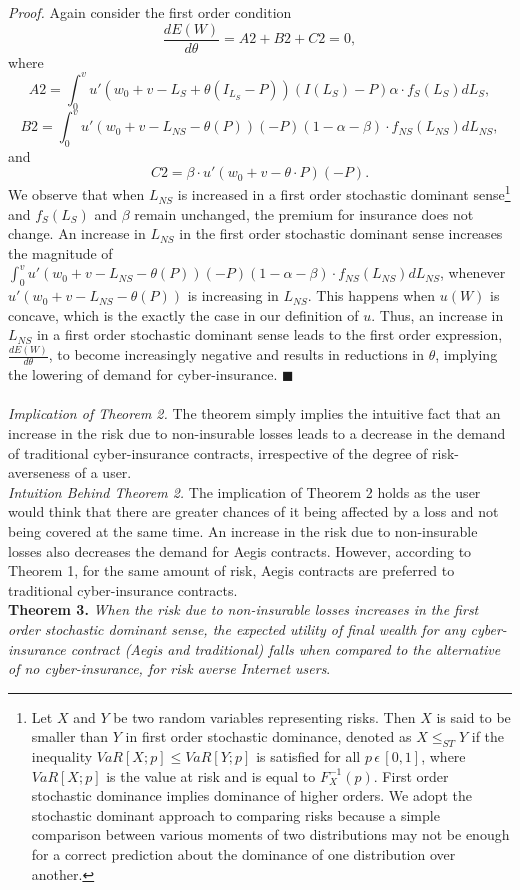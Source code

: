\documentclass[letterpaper,12pt, onecolumn, nodraft]{IEEEtran}
\begin{document}
\emph{Proof.} Again consider the first order condition
\begin{equation}
\frac{dE(W)}{d\theta} = A2 + B2 + C2 = 0,
\end{equation}
where
\[A2 = \int_{0}^{v}u'(w_{0} + v - L_{S} + \theta(I_{L_{S}} - P))(I(L_{S}) - P)\alpha\cdot f_{S}(L_{S})dL_{S},\]
\[B2 = \int_{0}^{v}u'(w_{0} + v - L_{NS} - \theta(P))(-P)(1 - \alpha - \beta)\cdot f_{NS}(L_{NS})dL_{NS},\]
and
\[C2 =  \beta\cdot u'(w_{0} + v - \theta\cdot P)(-P).\]
We observe that when $L_{NS}$ is increased in a first order stochastic dominant sense\footnote{Let $X$ and $Y$ be two random variables representing risks. Then $X$ is said to be smaller than $Y$ in first order stochastic dominance, denoted as $X \le_{ST} Y$ if the inequality $VaR[X;p] \le VaR[Y; p]$ is satisfied for all $p\,\epsilon\,[0,1]$, where $VaR[X;p]$ is the value at risk and is equal to $F_{X}^{-1}(p)$. First order stochastic dominance implies dominance of higher orders. We adopt the stochastic dominant approach to comparing risks because a simple comparison between various moments of two distributions may not be enough for a correct prediction about the dominance of one distribution over another.} and $f_{S}(L_{S})$ and $\beta$ remain unchanged, the premium for insurance does not change. An increase in $L_{NS}$ in the first order stochastic dominant sense increases the magnitude of $\int_{0}^{v}u'(w_{0} + v - L_{NS} - \theta(P))(-P)(1 - \alpha - \beta)\cdot f_{NS}(L_{NS})dL_{NS}$, whenever $u'(w_{0} + v - L_{NS} - \theta(P))$ is increasing in $L_{NS}$. This happens when $u(W)$ is concave, which is the exactly the case in our definition of $u$. Thus, an increase in $L_{NS}$ in a first order stochastic dominant sense leads to the first order expression, $\frac{dE(W)}{d\theta}$, to become increasingly negative and results in reductions in $\theta$, implying the lowering of demand for cyber-insurance.  $\blacksquare$\\ \\
\emph{Implication of Theorem 2.} The theorem simply implies the intuitive fact that an increase in the risk due to non-insurable losses leads to a decrease in the demand of traditional cyber-insurance contracts, irrespective of the degree of risk-averseness of a user.\\ 
\emph{Intuition Behind Theorem 2.} The implication of Theorem 2 holds as the user would think that there are greater chances of it being affected by a loss and not being covered at the same time. An increase in the risk due to non-insurable losses also decreases the demand for Aegis contracts. However, according to Theorem 1, for the same amount of risk, Aegis contracts are preferred to traditional cyber-insurance contracts. \\ 
\textbf{Theorem 3.} \emph{When the risk due to non-insurable losses increases in the first order stochastic dominant sense, the expected utility of final wealth for any cyber-insurance contract (Aegis and traditional) falls when compared to the alternative of no cyber-insurance, for risk averse Internet users}. \\
\end{document}
